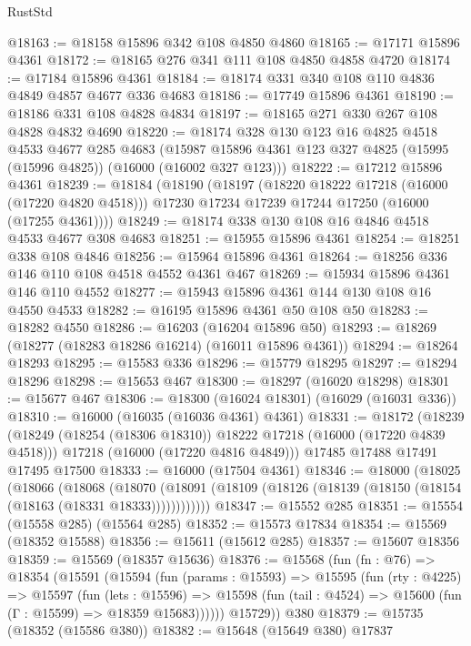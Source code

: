 \begin{lexlean}{RustStd}
\begin{coremodule}
@18163 := @18158 @15896 @342 @108 @4850 @4860
@18165 := @17171 @15896 @4361
@18172 := @18165 @276 @341 @111 @108 @4850 @4858 @4720
@18174 := @17184 @15896 @4361
@18184 := @18174 @331 @340 @108 @110 @4836 @4849 @4857 @4677 @336 @4683
@18186 := @17749 @15896 @4361
@18190 := @18186 @331 @108 @4828 @4834
@18197 := @18165 @271 @330 @267 @108 @4828 @4832 @4690
@18220 := @18174
    @328
    @130
    @123
    @16
    @4825
    @4518
    @4533
    @4677
    @285
    @4683
    (@15987 @15896 @4361 @123 @327 @4825 (@15995 (@15996 @4825)) (@16000 (@16002 @327 @123)))
@18222 := @17212 @15896 @4361
@18239 := @18184
    (@18190
      (@18197
        (@18220 @18222 @17218 (@16000 (@17220 @4820 @4518)))
        @17230
        @17234
        @17239
        @17244
        @17250
        (@16000 (@17255 @4361))))
@18249 := @18174 @338 @130 @108 @16 @4846 @4518 @4533 @4677 @308 @4683
@18251 := @15955 @15896 @4361
@18254 := @18251 @338 @108 @4846
@18256 := @15964 @15896 @4361
@18264 := @18256 @336 @146 @110 @108 @4518 @4552 @4361 @467
@18269 := @15934 @15896 @4361 @146 @110 @4552
@18277 := @15943 @15896 @4361 @144 @130 @108 @16 @4550 @4533
@18282 := @16195 @15896 @4361 @50 @108 @50
@18283 := @18282 @4550
@18286 := @16203 (@16204 @15896 @50)
@18293 := @18269 (@18277 (@18283 @18286 @16214) (@16011 @15896 @4361))
@18294 := @18264 @18293
@18295 := @15583 @336
@18296 := @15779 @18295
@18297 := @18294 @18296
@18298 := @15653 @467
@18300 := @18297 (@16020 @18298)
@18301 := @15677 @467
@18306 := @18300 (@16024 @18301) (@16029 (@16031 @336))
@18310 := @16000 (@16035 (@16036 @4361) @4361)
@18331 := @18172
    (@18239
      (@18249 (@18254 (@18306 @18310)) @18222 @17218 (@16000 (@17220 @4839 @4518)))
      @17218
      (@16000 (@17220 @4816 @4849)))
    @17485
    @17488
    @17491
    @17495
    @17500
@18333 := @16000 (@17504 @4361)
@18346 := @18000
    (@18025
      (@18066
        (@18068
          (@18070 (@18091 (@18109 (@18126 (@18139 (@18150 (@18154 (@18163 (@18331 @18333))))))))))))
@18347 := @15552 @285
@18351 := @15554 (@15558 @285) (@15564 @285)
@18352 := @15573 @17834
@18354 := @15569 (@18352 @15588)
@18356 := @15611 (@15612 @285)
@18357 := @15607 @18356
@18359 := @15569 (@18357 @15636)
@18376 := @15568
    (fun (fn : @76) =>
    @18354
      (@15591
        (@15594
          (fun (params : @15593) =>
          @15595
            (fun (rty : @4225) =>
            @15597
              (fun (lets : @15596) =>
              @15598 (fun (tail : @4524) => @15600 (fun (Γ : @15599) => @18359 @15683))))))
        @15729))
    @380
@18379 := @15735 (@18352 (@15586 @380))
@18382 := @15648 (@15649 @380) @17837

\end{coremodule}
\end{lexlean}
